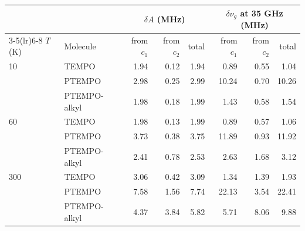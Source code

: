 \begin{tabular}{llrrrrrr}
\toprule
 & & \multicolumn{3}{c}{$\delta A$ (MHz)} & \multicolumn{3}{c}{$\delta\nu_g$ at 35 GHz (MHz)}\\
\cmidrule(lr){3-5}\cmidrule(lr){6-8}
$T$ (K) & Molecule & from $c_1$ & from $c_2$ & total & from $c_1$ & from $c_2$ & total\\
\midrule
10 & TEMPO & 1.94 & 0.12 & 1.94 & 0.89 & 0.55 & 1.04\\
 & PTEMPO & 2.98 & 0.25 & 2.99 & 10.24 & 0.70 & 10.26\\
 & PTEMPO-alkyl & 1.98 & 0.18 & 1.99 & 1.43 & 0.58 & 1.54\\
\midrule
60 & TEMPO & 1.98 & 0.13 & 1.99 & 0.89 & 0.57 & 1.06\\
 & PTEMPO & 3.73 & 0.38 & 3.75 & 11.89 & 0.93 & 11.92\\
 & PTEMPO-alkyl & 2.41 & 0.78 & 2.53 & 2.63 & 1.68 & 3.12\\
\midrule
300 & TEMPO & 3.06 & 0.42 & 3.09 & 1.34 & 1.39 & 1.93\\
 & PTEMPO & 7.58 & 1.56 & 7.74 & 22.13 & 3.54 & 22.41\\
 & PTEMPO-alkyl & 4.37 & 3.84 & 5.82 & 5.71 & 8.06 & 9.88\\
\bottomrule
\end{tabular}
